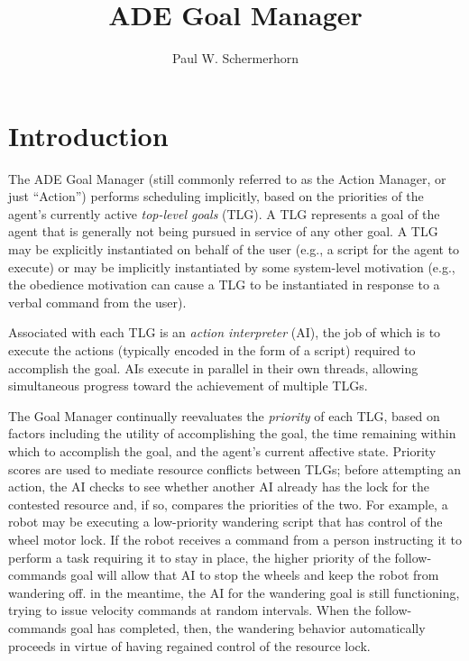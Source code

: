 \documentclass[11pt,letterpaper]{article}
\begin{document}
\title{\huge ADE Goal Manager}
\author{Paul W. Schermerhorn}

\maketitle
\thispagestyle{empty}
\newpage
\tableofcontents
\newpage

\section{Introduction}

The ADE Goal Manager (still commonly referred to as the Action
Manager, or just ``Action'') performs scheduling implicitly, based on
the priorities of the agent's currently active {\em top-level goals}
(TLG).  A TLG represents a goal of the agent that is generally not
being pursued in service of any other goal.  A TLG may be explicitly
instantiated on behalf of the user (e.g., a script for the agent to
execute) or may be implicitly instantiated by some system-level
motivation (e.g., the obedience motivation can cause a TLG to be
instantiated in response to a verbal command from the user).

Associated with each TLG is an {\em action interpreter} (AI), the job 
of which is to execute the actions (typically encoded in the form of a 
script) required to accomplish the goal.  AIs execute in parallel in 
their own threads, allowing simultaneous progress toward the 
achievement of multiple TLGs.  

The Goal Manager continually reevaluates the {\em priority} of each 
TLG, based on factors including the utility of accomplishing the goal, 
the time remaining within which to accomplish the goal, and the 
agent's current affective state.  Priority scores are used to mediate 
resource conflicts between TLGs; before attempting an action, the AI 
checks to see whether another AI already has the lock for the 
contested resource and, if so, compares the priorities of the two.  
For example, a robot may be executing a low-priority wandering script 
that has control of the wheel motor lock.  If the robot receives a 
command from a person instructing it to perform a task requiring it to 
stay in place, the higher priority of the follow-commands goal will 
allow that AI to stop the wheels and keep the robot from wandering 
off.  in the meantime, the AI for the wandering goal is still 
functioning, trying to issue velocity commands at random intervals.  
When the follow-commands goal has completed, then, the wandering 
behavior automatically proceeds in virtue of having regained control 
of the resource lock.
\end{document}
